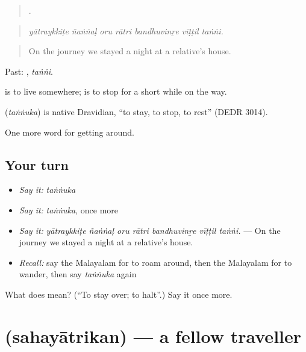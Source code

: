 \begin{quote}
      .
\end{quote}

\begin{quote}
\emph{yātraykkiṭe ñaṅṅaḷ oru rātri bandhuvinṟe vīṭṭil taṅṅi.}
\end{quote}

\begin{quote}
On the journey we stayed a night at a relative's house.
\end{quote}

Past: , \emph{taṅṅi}.

 is to live somewhere;  is to stop for a short while on the way.

\begin{cousinweb}
\textbf{} (\emph{taṅṅuka}) is native Dravidian, \textquotedblleft{}to stay, to stop, to rest\textquotedblright{} (DEDR 3014).
\end{cousinweb}

\begin{grammarlens}[title={What you've built}]
One more word for getting around.
\end{grammarlens}

\subsection*{Your turn}
\begin{itemize}
\raggedright
  \item \emph{Say it:} \emph{taṅṅuka}
  \item \emph{Say it:} \emph{taṅṅuka}, once more
  \item \emph{Say it:} \emph{yātraykkiṭe ñaṅṅaḷ oru rātri bandhuvinṟe vīṭṭil taṅṅi.} — On the journey we stayed a night at a relative's house.
  \item \emph{Recall:} say the Malayalam for to roam around, then the Malayalam for to wander, then say \emph{taṅṅuka} again
\end{itemize}

\begin{tcolorbox}[breakable,colback=teal!4,colframe=teal!35!black,title={Before you move on}]
What does  mean? (\textquotedblleft{}To stay over; to halt\textquotedblright{}.) Say it once more.
\end{tcolorbox}
\section[\texorpdfstring{\ml{സഹയാത്രികൻ} (sahayātrikan)}{സഹയാത്രികൻ (sahayātrikan)}]{ (sahayātrikan) — a fellow traveller}

